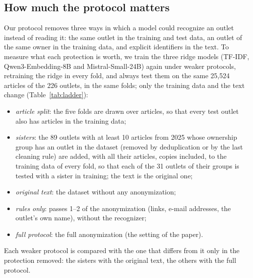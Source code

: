 \documentclass[11pt,a4paper]{article}
\begin{document}
\subsection{How much the protocol matters}\label{sec:ladder}
Our protocol removes three ways in which a model could recognize an outlet instead of reading it: the same outlet in
the training and test data, an outlet of the same owner in the training data, and explicit identifiers in the text. To
measure what each protection is worth, we train the three ridge models (TF-IDF, Qwen3-Embedding-8B and
Mistral-Small-24B) again under weaker protocols, retraining the ridge in every fold, and always test them on the same
25,524 articles of the 226 outlets, in the same folds; only the training data and the text change
(Table~\ref{tab:ladder}):
\begin{itemize}
  \item \emph{article split}: the five folds are drawn over articles, so that every test outlet also has articles in
        the training data;
  \item \emph{sisters}: the 89 outlets with at least 10 articles from 2025 whose ownership group has an outlet in the dataset
        (removed by deduplication or by the last cleaning rule) are added, with all their articles, copies included, to
        the training data of every fold, so that each of the 31 outlets of their groups is tested
        with a sister in training; the text is the original one;
  \item \emph{original text}: the dataset without any anonymization;
  \item \emph{rules only}: passes 1--2 of the anonymization (links, e-mail addresses, the outlet's own name), without
        the recognizer;
  \item \emph{full protocol}: the full anonymization (the setting of the paper).
\end{itemize}
Each weaker protocol is compared with the one that differs from it only in the protection removed: the sisters with the
original text, the others with the full protocol.
\end{document}
